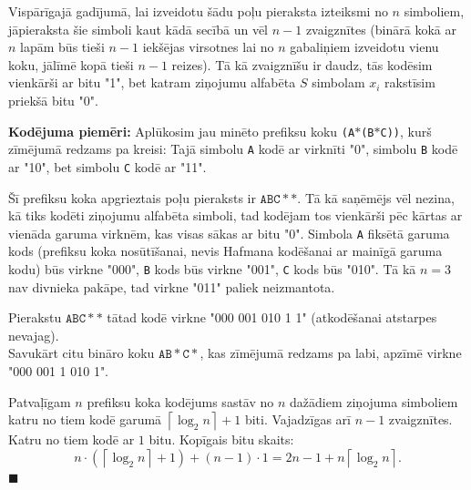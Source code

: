 \documentclass[11pt]{article}
\begin{document}
Vispārīgajā gadījumā, lai izveidotu šādu poļu pieraksta izteiksmi no $n$ simboliem, 
jāpieraksta šie simboli kaut kādā secībā un vēl $n-1$ zvaigznītes (binārā kokā 
ar $n$ lapām būs tieši $n-1$ iekšējas virsotnes \textendash{} lai no $n$ gabaliņiem izveidotu 
vienu koku, jālīmē kopā tieši $n-1$ reizes). 
Tā kā zvaigznīšu ir daudz, tās kodēsim vienkārši ar
bitu "1", bet katram ziņojumu alfabēta $S$ simbolam $x_i$ rakstīsim priekšā 
bitu "0".

{\bf Kodējuma piemēri:} Aplūkosim jau minēto
prefiksu koku {\tt (A$\ast$(B$\ast$C))}, kurš zīmējumā redzams pa kreisi: Tajā simbolu {\tt A} kodē ar 
virknīti "0", simbolu {\tt B} kodē ar "10", bet simbolu {\tt C} kodē ar "11".

Šī prefiksu koka apgrieztais poļu pieraksts ir $\mathtt{ABC}\ast\ast$. 
Tā kā saņēmējs vēl nezina, kā tiks kodēti ziņojumu alfabēta simboli,
tad kodējam tos vienkārši pēc kārtas ar vienāda garuma 
virknēm, kas visas sākas ar bitu "0". 
Simbola {\tt A} fiksētā garuma kods (prefiksu koka nosūtīšanai, 
nevis Hafmana kodēšanai ar mainīgā garuma kodu) būs 
virkne "000", {\tt B} kods būs virkne "001", 
{\tt C} kods būs "010". Tā kā $n=3$ nav divnieka pakāpe, tad virkne "011" paliek neizmantota. 

Pierakstu $\mathtt{ABC}\ast\ast$ tātad kodē virkne "000 001 010 1 1" (atkodēšanai atstarpes nevajag).\\
Savukārt citu bināro koku $\mathtt{AB}\ast\mathtt{C}\ast$, kas zīmējumā redzams pa labi, 
apzīmē virkne "000 001 1 010 1".

Patvaļīgam $n$ prefiksu koka kodējums sastāv no $n$ dažādiem ziņojuma simboliem \textendash{} katru 
no tiem kodē garumā $\left\lceil \log_2 n \right\rceil + 1$ biti. Vajadzīgas arī $n-1$ 
zvaigznītes. Katru no tiem kodē ar $1$ bitu. Kopīgais bitu skaits:
$$n\cdot\left( \left\lceil \log_2 n \right\rceil + 1 \right) + 
(n-1)\cdot{}1 = 2n-1 + n \left\lceil \log_2 n \right\rceil.$$
$\blacksquare$
\end{document}
